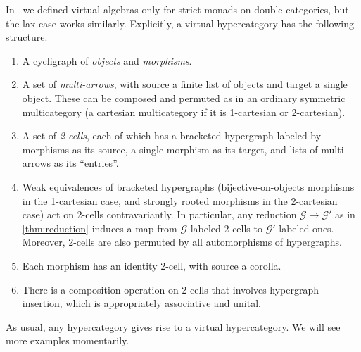 \documentclass{article}
\theoremstyle{definition}
\newtheorem{defn}[thm]{Definition}
\theoremstyle{remark}
\def\M{\mathbb{M}}
\def\G{\mathcal{G}}
\begin{document}
In~\cite{cs:multicats} we defined virtual algebras only for strict monads on double categories, but the lax case works similarly.
Explicitly, a virtual hypercategory has the following structure.
\begin{enumerate}
\item A cycligraph of \emph{objects} and \emph{morphisms}.
\item A set of \emph{multi-arrows}, with source a finite list of objects and target a single object.
  These can be composed and permuted as in an ordinary symmetric multicategory (a cartesian multicategory if it is 1-cartesian or 2-cartesian).
\item A set of \emph{2-cells}, each of which has a bracketed hypergraph labeled by morphisms as its source, a single morphism as its target, and lists of multi-arrows as its ``entries''.
\item Weak equivalences of bracketed hypergraphs (bijective-on-objects morphisms in the 1-cartesian case, and strongly rooted morphisms in the 2-cartesian case) act on 2-cells contravariantly.
  In particular, any reduction $\G\to \G'$ as in \cref{thm:reduction} induces a map from $\G$-labeled 2-cells to $\G'$-labeled ones.
  Moreover, 2-cells are also permuted by all automorphisms of hypergraphs.
\item Each morphism has an identity 2-cell, with source a corolla.
\item There is a composition operation on 2-cells that involves hypergraph insertion, which is appropriately associative and unital.
\end{enumerate}

As usual, any hypercategory gives rise to a virtual hypercategory.
We will see more examples momentarily.


\end{document}

